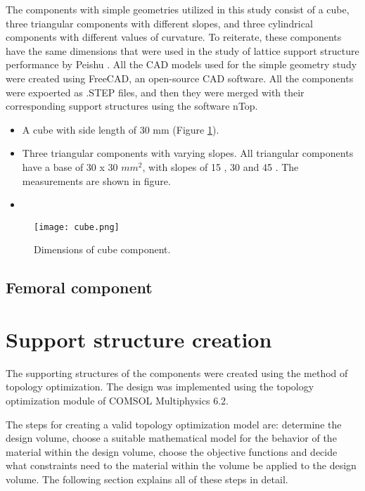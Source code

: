 \documentclass[../main.tex]{subfiles}
\begin{document}
The components with simple geometries utilized in this study consist of a cube, three triangular
components with different slopes, and three cylindrical components with different values of
curvature. To reiterate, these components have the same dimensions that were used in the study of lattice
support structure performance by Peishu \cite{peishu_thesis}. All the CAD models
used for the simple geometry study were created using FreeCAD, an open-source CAD software. All the components were expoerted as .STEP files, and then they were merged with their corresponding support structures using the software nTop. 

\begin{itemize}
  \item A cube with side length of 30 mm (Figure \ref{fig:cube}).
  \item Three triangular components with varying slopes. All triangular components have a base of 30 x 30 $mm^2$, with slopes of 15 \degree, 30  \degree and 45 \degree. The measurements are shown in figure. 
  \item {}
\end{itemize}

\begin{figure}
	\begin{center}
		\texttt{[image: cube.png]}
	\end{center}
	\caption{Dimensions of cube component.}\label{fig:cube}
\end{figure}


\subsection{Femoral component}


\section{Support structure creation}

The supporting structures of the components were created using the method of topology optimization. The design was implemented using the topology optimization module of COMSOL Multiphysics 6.2.  

The steps for creating a valid topology optimization model are: determine the design volume, choose a suitable mathematical model for the behavior of the material within the design volume, choose the objective functions and decide what constraints need to the material within the volume be applied to the design volume. The following section explains all of these steps in detail.
\end{document}
